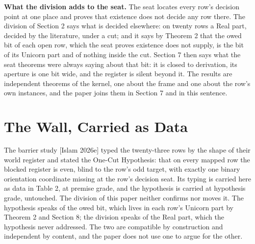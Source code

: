 \documentclass[10pt,twocolumn]{article}
\begin{document}
\textbf{What the division adds to the seat.} The seat locates every
row's decision point at one place and proves that existence does not
decide any row there. The division of Section 2 says what is decided
elsewhere: on twenty rows a Real part, decided by the literature, under
a cut; and it says by Theorem 2 that the owed bit of each open row,
which the seat proves existence does not supply, is the bit of its
Unicorn part and of nothing inside the cut. Section 7 then says what the
seat theorems were always saying about that bit: it is closed to
derivation, its aperture is one bit wide, and the register is silent
beyond it. The results are independent theorems of the kernel, one about
the frame and one about the row's own instances, and the paper joins
them in Section 7 and in this sentence.

\hypertarget{the-wall-carried-as-data}{%
\section{The Wall, Carried as Data}\label{the-wall-carried-as-data}}

The barrier study {[}Islam 2026e{]} typed the twenty-three rows by the
shape of their world register and stated the One-Cut Hypothesis: that on
every mapped row the blocked register is even, blind to the row's odd
target, with exactly one binary orientation coordinate missing at the
row's decision seat. Its typing is carried here as data in Table 2, at
premise grade, and the hypothesis is carried at hypothesis grade,
untouched. The division of this paper neither confirms nor moves it. The
hypothesis speaks of the owed bit, which lives in each row's Unicorn
part by Theorem 2 and Section 8; the division speaks of the Real part,
which the hypothesis never addressed. The two are compatible by
construction and independent by content, and the paper does not use one
to argue for the other.
\end{document}
